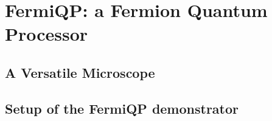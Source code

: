 \renewcommand{\imagepath}{../20-fermiqp/img}

\chapter{FermiQP: a Fermion Quantum Processor}

\section{A Versatile Microscope}


\section{Setup of the FermiQP demonstrator}